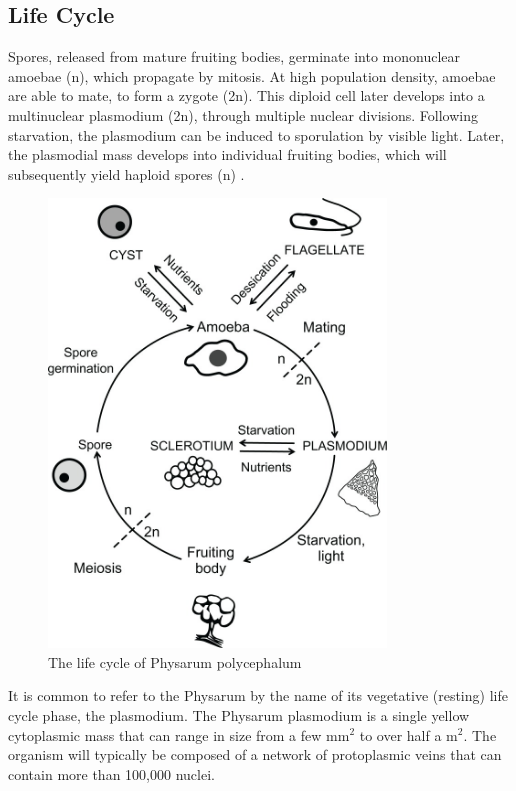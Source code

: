 \subsection{Life Cycle}
Spores, released from mature fruiting bodies, germinate into mononuclear amoebae (n), which propagate by mitosis. At high population density, amoebae are able to mate, to form a zygote (2n). This diploid cell later develops into a multinuclear plasmodium (2n), through multiple nuclear divisions. Following starvation, the plasmodium can be induced to sporulation by visible light. Later, the plasmodial mass develops into individual fruiting bodies, which will subsequently yield haploid spores (n) \cite{physlf}.

\begin{figure}
  \centering
    \includegraphics[width=0.8\textwidth]{physarum_life_cycle}%
    
  \caption{The life cycle of Physarum polycephalum\cite{physlf}}
  \label{fig:physarum_life_cycle}
\end{figure}

It is common to refer to the Physarum by the name of its vegetative (resting) life cycle phase, the plasmodium. The Physarum plasmodium is a single yellow cytoplasmic mass that can range in size from a few mm$^2$ to over half a m$^2$. The organism will typically be composed of a network of protoplasmic veins that can contain more than 100,000 nuclei.

